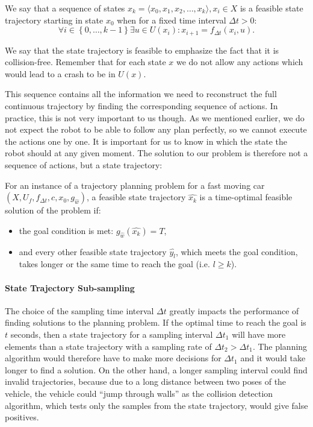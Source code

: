 \begin{defn}
	We say that a sequence of states $\hat{x_k}=\langle x_0,x_1,x_2,…,x_k \rangle ,x_i\in X$ is a feasible state trajectory starting in state $x_0$ when for a fixed time interval $\Delta t>0$:
	\[
	\forall i \in \left\{ 0,\ldots,k-1\right\} \exists u\in U(x_i): x_{i+1}=f_{\Delta t} (x_i,u).
	\]
\end{defn}

We say that the state trajectory is feasible to emphasize the fact that it is collision-free. Remember that for each state $x$ we do not allow any actions which would lead to a crash to be in $U(x)$.

This sequence contains all the information we need to reconstruct the full continuous trajectory by finding the corresponding sequence of actions. In practice, this is not very important to us though. As we mentioned earlier, we do not expect the robot to be able to follow any plan perfectly, so we cannot execute the actions one by one. It is important for us to know in which the state the robot should at any given moment. The solution to our problem is therefore not a sequence of actions, but a state trajectory:

\begin{defn}
	For an instance of a trajectory planning problem for a fast moving car $\left(X, U_f, f_{\Delta t}, c, x_0, g_{\hat{w}}\right)$, a feasible state trajectory $\hat{x_k}$ is a time-optimal feasible solution of the problem if:
	\begin{itemize}
		\item the goal condition is met: $g_{\hat{w}}\left( \hat{x_k} \right) = T$,
		\item and every other feasible state trajectory $\hat{y_l}$, which meets the goal condition, takes longer or the same time to reach the goal (i.e. $l \geq k$).
	\end{itemize}
\end{defn}

\paragraph{State Trajectory Sub-sampling}

The choice of the sampling time interval $\Delta t$ greatly impacts the performance of finding solutions to the planning problem. If the optimal time to reach the goal is $t$ seconds, then a state trajectory for a sampling interval $\Delta t_1$ will have more elements than a state trajectory with a sampling rate of $\Delta t_2 > \Delta t_1$. The planning algorithm would therefore have to make more decisions for $\Delta t_1$ and it would take longer to find a solution. On the other hand, a longer sampling interval could find invalid trajectories, because due to a long distance between two poses of the vehicle, the vehicle could ``jump through walls'' as the collision detection algorithm, which tests only the samples from the state trajectory, would give false positives.

